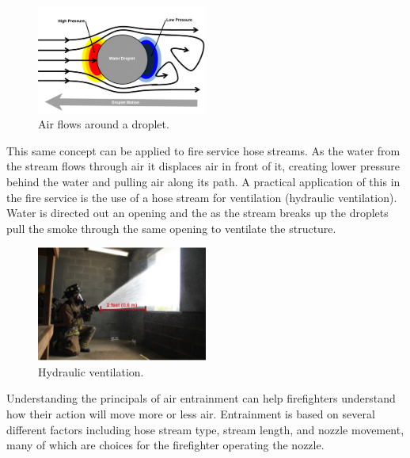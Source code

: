 \documentclass[12pt,oneside]{book}
\begin{document}
\begin{figure}[H]
\centering
\includegraphics[width=0.5\textwidth]{Figures/Air_Entrainment/Droplet_Etrainment.png}
\caption[Air Flow Around a Droplet]{Air flows around a droplet.}
\label{fig:droplet_flow}
\end{figure}

This same concept can be applied to fire service hose streams. As the water from the stream flows through air it displaces air in front of it, creating lower pressure behind the water and pulling air along its path. A practical application of this in the fire service is the use of a hose stream for ventilation (hydraulic ventilation). Water is directed out an opening and the as the stream breaks up the droplets pull the smoke through the same opening to ventilate the structure.

\begin{figure}[H]
\centering
\includegraphics[width=0.5\textwidth]{Figures/Air_Entrainment/Hydraulic_Ventilation.png}
\caption[Hydraulic ventilation]{Hydraulic ventilation.}
\label{fig:Hydraulic_Vent}
\end{figure}
 
Understanding the principals of air entrainment can help firefighters understand how their action will move more or less air. Entrainment is based on several different factors including hose stream type, stream length, and nozzle movement, many of which are choices for the firefighter operating the nozzle.
\end{document}
